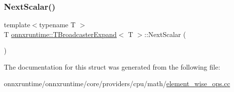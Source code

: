 \mbox{\label{structonnxruntime_1_1TBroadcasterExpand_a761c9e4cb5fc6ca6f48b5cfdb4ab68a1}} 
\subsubsection{\texorpdfstring{Next\+Scalar()}{NextScalar()}}
{\footnotesize\ttfamily template$<$typename T $>$ \\
T \mbox{\hyperlink{structonnxruntime_1_1TBroadcasterExpand}{onnxruntime\+::\+T\+Broadcaster\+Expand}}$<$ T $>$\+::Next\+Scalar (\begin{DoxyParamCaption}{ }\end{DoxyParamCaption})\hspace{0.3cm}{\ttfamily [inline]}}



The documentation for this struct was generated from the following file\+:\begin{DoxyCompactItemize}
\item 
onnxruntime/onnxruntime/core/providers/cpu/math/\mbox{\hyperlink{element__wise__ops_8cc}{element\+\_\+wise\+\_\+ops.\+cc}}\end{DoxyCompactItemize}

